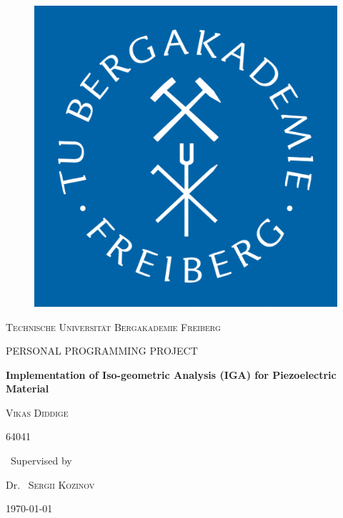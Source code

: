 \documentclass[11pt]{article}
\begin{document}
\begin{titlepage}
	\centering
	
	\begin{figure}
		\begin{center}
			\includegraphics[scale=.2]{tubaf.pdf}  
		\end{center}
		
	\end{figure}
	

	
	
	
	{\scshape\LARGE Technische Universit\"at Bergakademie Freiberg \par}
	\vspace{1cm}
	{\scshape\Large PERSONAL PROGRAMMING PROJECT\par}
	\vspace{1.5cm}
	{\huge\bfseries Implementation of Iso-geometric Analysis (IGA) for
		Piezoelectric Material \par}
	\vspace{2cm}
	{\scshape\Large Vikas Diddige\par}
	{\scshape\Large 64041\par}
	\vfill
	{\normalsize\ Supervised by\par}
	
	Dr.~ \textsc{Sergii Kozinov}
	
	\vfill
	
	{\large \today\par}
\end{titlepage}
\end{document}
